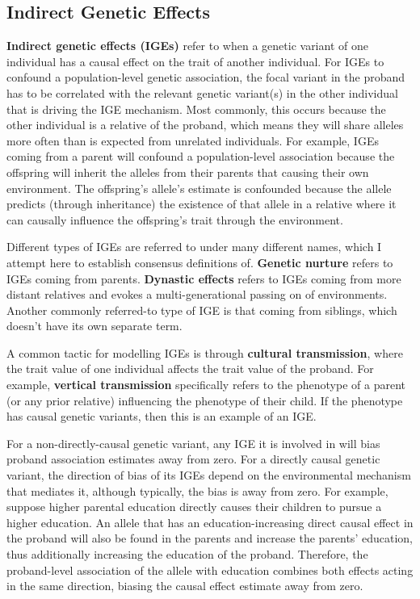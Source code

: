 \documentclass[12pt]{article}
\begin{document}

\subsection{Indirect Genetic Effects}
\textbf{Indirect genetic effects (IGEs)} refer to when a genetic variant of one individual has a causal effect on the trait of another individual.
For IGEs to confound a population-level genetic association, the focal variant in the proband has to be correlated with the relevant genetic variant(s) in the other individual that is driving the IGE mechanism.
Most commonly, this occurs because the other individual is a relative of the proband, which means they will share alleles more often than is expected from unrelated individuals.
For example, IGEs coming from a parent will confound a population-level association because the offspring will inherit the alleles from their parents that causing their own environment.
The offspring's allele's estimate is confounded because the allele predicts (through inheritance) the existence of that allele in a relative where it can causally influence the offspring's trait through the environment.

Different types of IGEs are referred to under many different names, which I attempt here to establish consensus definitions of.
\textbf{Genetic nurture} refers to IGEs coming from parents.
\textbf{Dynastic effects} refers to IGEs coming from more distant relatives and evokes a multi-generational passing on of environments.
Another commonly referred-to type of IGE is that coming from siblings, which doesn't have its own separate term.

A common tactic for modelling IGEs is through \textbf{cultural transmission}, where the trait value of one individual affects the trait value of the proband.
For example, \textbf{vertical transmission} specifically refers to the phenotype of a parent (or any prior relative) influencing the phenotype of their child.
If the phenotype has causal genetic variants, then this is an example of an IGE.

For a non-directly-causal genetic variant, any IGE it is involved in will bias proband association estimates away from zero.
For a directly causal genetic variant, the direction of bias of its IGEs depend on the environmental mechanism that mediates it, although typically, the bias is away from zero.
For example, suppose higher parental education directly causes their children to pursue a higher education.
An allele that has an education-increasing direct causal effect in the proband will also be found in the parents and increase the parents' education, thus additionally increasing the education of the proband.
Therefore, the proband-level association of the allele with education combines both effects acting in the same direction, biasing the causal effect estimate away from zero.
\end{document}
